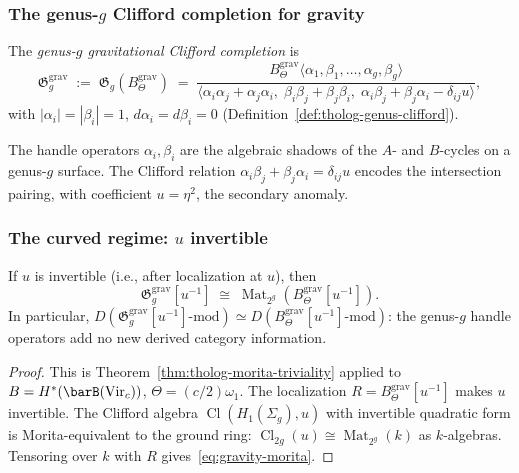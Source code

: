 \subsubsection*{The genus-$g$ Clifford completion for gravity}

\begin{definition}
\label{def:gravity-genus-g-completion}
The \emph{genus-$g$ gravitational Clifford completion} is
\[
\mathfrak{G}_g^{\mathrm{grav}}
\;:=\;
\mathfrak{G}_g(B_\Theta^{\mathrm{grav}})
\;=\;
\frac{
 B_\Theta^{\mathrm{grav}}
 \langle \alpha_1, \beta_1, \ldots, \alpha_g, \beta_g \rangle
}{
 \langle
 \alpha_i\alpha_j + \alpha_j\alpha_i,\;
 \beta_i\beta_j + \beta_j\beta_i,\;
 \alpha_i\beta_j + \beta_j\alpha_i - \delta_{ij}u
 \rangle
},
\]
with $|\alpha_i| = |\beta_i| = 1$, $d\alpha_i = d\beta_i = 0$
\textup{(}Definition~\textup{\ref{def:tholog-genus-clifford}}\textup{)}.
\end{definition}

The handle operators $\alpha_i, \beta_i$ are the algebraic
shadows of the $A$- and $B$-cycles on a genus-$g$ surface.
The Clifford relation $\alpha_i\beta_j + \beta_j\alpha_i
= \delta_{ij}u$ encodes the intersection pairing, with
coefficient $u = \eta^2$, the secondary anomaly.

\subsubsection*{The curved regime: $u$ invertible}

\begin{theorem}
\label{thm:gravity-morita-triviality}
If $u$ is invertible \textup{(}i.e., after localization at
$u$\textup{)}, then
\begin{equation}\label{eq:gravity-morita}
\mathfrak{G}_g^{\mathrm{grav}}[u^{-1}]
\;\cong\;
\operatorname{Mat}_{2^g}\!\left(
 B_\Theta^{\mathrm{grav}}[u^{-1}]
\right).
\end{equation}
In particular,
$D(\mathfrak{G}_g^{\mathrm{grav}}[u^{-1}]\text{-mod})
\simeq D(B_\Theta^{\mathrm{grav}}[u^{-1}]\text{-mod})$:
the genus-$g$ handle operators add no new derived category
information.
\end{theorem}

\begin{proof}
This is
Theorem~\ref{thm:tholog-morita-triviality}
applied to $B = H^*(\barB(\mathrm{Vir}_c))$,
$\Theta = (c/2)\omega_1$. The localization $R =
B_\Theta^{\mathrm{grav}}[u^{-1}]$ makes $u$
invertible. The Clifford algebra
$\operatorname{Cl}(H_1(\Sigma_g), u)$ with
invertible quadratic form is Morita-equivalent to the ground ring:
$\operatorname{Cl}_{2g}(u) \cong
\operatorname{Mat}_{2^g}(k)$ as $k$-algebras.
Tensoring over $k$ with $R$ gives~\eqref{eq:gravity-morita}.
\end{proof}

